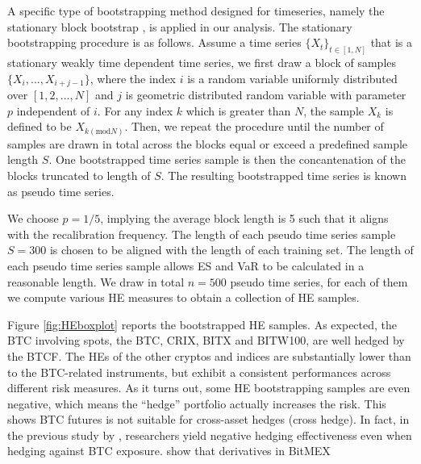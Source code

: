 A specific type of bootstrapping method designed for timeseries, namely the stationary block bootstrap \cite{Politis1994}, is applied in our analysis.
The stationary bootstrapping procedure is as follows. 
Assume a time series $\{X_t\}_{t \in [1,N]}$ that is
a stationary weakly time dependent time series,
 we first draw a block of samples $\{X_i, ..., X_{i+j-1}\}$, where the index $i$ is a
random variable uniformly distributed over 
$[1,2,...,N]$ and $j$ is geometric distributed random variable with
parameter $p$ independent of $i$. 
For any index $k$ which is greater than $N$, the sample $X_k$ is
defined to be $X_{k(\mathrm{mod} N)}$. 
Then, we repeat the procedure until the number of samples are drawn in total across the blocks equal or exceed a predefined sample length $S$. 
One bootstrapped time series sample is then the concantenation of the blocks truncated to length of $S$.
The resulting bootstrapped time series is known as pseudo time series. 

We choose $p=1/5$, implying the average block length is 5 such that it aligns with the recalibration frequency. 
The length of each pseudo time series sample $S = 300$ is chosen to be aligned with the length of each training set.  
The length of each pseudo time series sample allows ES and VaR to be calculated in a reasonable length.
We draw in total $n=500$ pseudo time series,
for each of them we compute various HE measures to obtain a collection of HE samples. 




Figure \ref{fig:HEboxplot} reports the bootstrapped HE samples.
As expected, the BTC involving spots, the BTC, CRIX, BITX and BITW100, are well hedged
by the BTCF. 
The HEs of the other cryptos and indices are
substantially lower than to the BTC-related instruments, but 
exhibit a consistent performances across different risk measures. 
As it turns out, some HE bootstrapping samples are even negative,
which means the ``hedge'' portfolio actually increases the risk. 
This shows BTC futures is not suitable for cross-asset hedges (cross hedge).
In fact, in the previous study by \citet{corbet2018bitcoin}, 
researchers yield negative hedging effectiveness even when hedging against BTC exposure.
\citet{} show that derivatives in BitMEX

